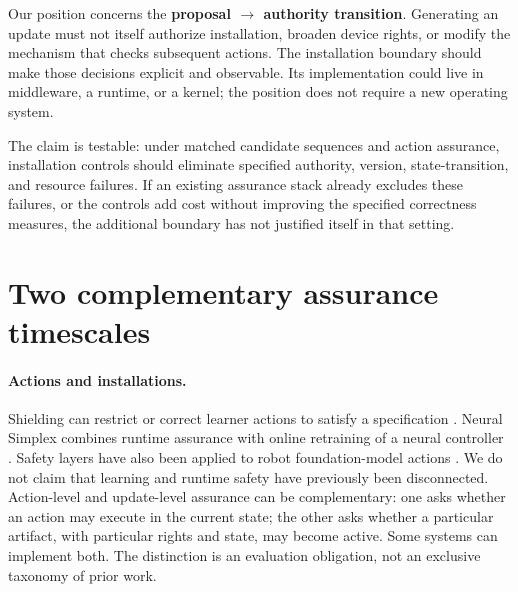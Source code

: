 \documentclass{article}
\begin{document}
Our position concerns the \textbf{proposal $\rightarrow$ authority transition}. Generating an update must not itself authorize installation, broaden device rights, or modify the mechanism that checks subsequent actions. The installation boundary should make those decisions explicit and observable. Its implementation could live in middleware, a runtime, or a kernel; the position does not require a new operating system.

\begin{center}
\end{center}

The claim is testable: under matched candidate sequences and action assurance, installation controls should eliminate specified authority, version, state-transition, and resource failures. If an existing assurance stack already excludes these failures, or the controls add cost without improving the specified correctness measures, the additional boundary has not justified itself in that setting.

\section{Two complementary assurance timescales}
\label{sec:requirements}
\paragraph{Actions and installations.}
Shielding can restrict or correct learner actions to satisfy a specification \citep{alshiekh2018shielding}. Neural Simplex combines runtime assurance with online retraining of a neural controller \citep{phan2020neural}. Safety layers have also been applied to robot foundation-model actions \citep{tolle2025safe}. We do not claim that learning and runtime safety have previously been disconnected. Action-level and update-level assurance can be complementary: one asks whether an action may execute in the current state; the other asks whether a particular artifact, with particular rights and state, may become active. Some systems can implement both. The distinction is an evaluation obligation, not an exclusive taxonomy of prior work.
\end{document}
